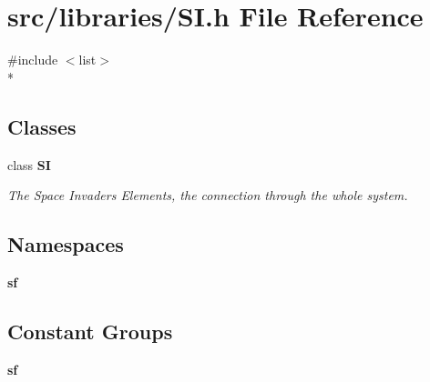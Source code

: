 \section{src/libraries/\-S\-I.h File Reference}
\label{_s_i_8h}
{\ttfamily \#include $<$list$>$}\\*
\subsection*{Classes}
\begin{DoxyCompactItemize}
\item 
class {\bf S\-I}
\begin{DoxyCompactList}\small\item\em The Space Invaders Elements, the connection through the whole system. \end{DoxyCompactList}\end{DoxyCompactItemize}
\subsection*{Namespaces}
\begin{DoxyCompactItemize}
\item 
{\bf sf}
\end{DoxyCompactItemize}
\subsection*{Constant Groups}
\begin{DoxyCompactItemize}
\item 
{\bf sf}
\end{DoxyCompactItemize}
